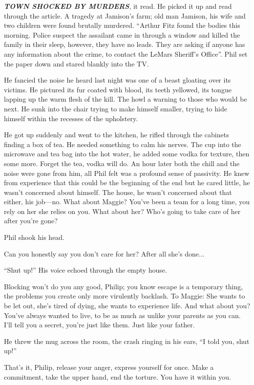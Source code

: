 \textbf{\emph{TOWN SHOCKED BY MURDERS}}, it read. He picked it up and
read through the article. A tragedy at Jamison's farm; old man Jamison,
his wife and two children were found brutally murdered. ``Arthur Fitz
found the bodies this morning. Police suspect the assailant came in
through a window and killed the family in their sleep, however, they
have no leads. They are asking if anyone has any information about the
crime, to contact the LeMars Sheriff's Office''. Phil set the paper down
and stared blankly into the TV.

He fancied the noise he heard last night was one of a beast gloating
over its victims. He pictured its fur coated with blood, its teeth
yellowed, its tongue lapping up the warm flesh of the kill. The howl a
warning to those who would be next. He sunk into the chair trying to
make himself smaller, trying to hide himself within the recesses of the
upholstery.

He got up suddenly and went to the kitchen, he rifled through the
cabinets finding a box of tea. He needed something to calm his nerves.
The cup into the microwave and tea bag into the hot water, he added some
vodka for texture, then some more. Forget the tea, vodka will do. An
hour later both the chill and the noise were gone from him, all Phil
felt was a profound sense of passivity. He knew from experience that
this could be the beginning of the end but he cared little, he wasn't
concerned about himself. The house, he wasn't concerned about that
either, his job---no. What about Maggie? You've been a team for a long
time, you rely on her she relies on you. What about her? Who's going to
take care of her after you're gone?

Phil shook his head.

Can you honestly say you don't care for her? After all she's done...

``Shut up!'' His voice echoed through the empty house.

Blocking won't do you any good, Philip; you know escape is a temporary
thing, the problems you create only more virulently backlash. To Maggie:
She wants to be let out, she's tired of dying, she wants to experience
life. And what about you? You've always wanted to live, to be as much as
unlike your parents as you can. I'll tell you a secret, you're just like
them. Just like your father.

He threw the mug across the room, the crash ringing in his ears, ``I
told you, shut up!''

That's it, Philip, release your anger, express yourself for once. Make a
commitment, take the upper hand, end the torture. You have it within
you.


